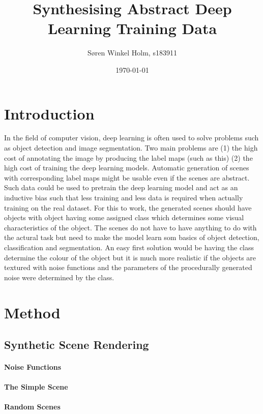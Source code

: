 \documentclass[12pt,fleqn]{article}
\title{Synthesising Abstract Deep Learning Training Data}
\author{Søren Winkel Holm, s183911}
\date{\today}
\begin{document}
\maketitle
\thispagestyle{fancy}
\tableofcontents
\newpage


\section{Introduction}%
\label{sec:intro}
In the field of computer vision, deep learning is often used to solve problems such as object detection and image segmentation. Two main problems are (1) the high cost of annotating the image by producing the label maps (such as this) (2) the high cost of training the deep learning models. Automatic generation of scenes with corresponding label maps might be usable even if the scenes are abstract. Such data could be used to pretrain the deep learning model and act as an inductive bias such that less training and less data is required when actually training on the real dataset. For this to work, the generated scenes should have objects with object having some assigned class which determines some visual characteristics of the object. The scenes do not have to have anything to do with the actural task but need to make the model learn som basics of object detection, classification and segmentation. An easy first solution would be having the class determine the colour of the object but it is much more realistic if the objects are textured with noise functions and the parameters of the procedurally generated noise were determined by the class.

\section{Method}%
\label{sec:method}
\subsection{Synthetic Scene Rendering}
\paragraph{Noise Functions}
\paragraph{The Simple Scene}
\paragraph{Random Scenes}
\end{document}
